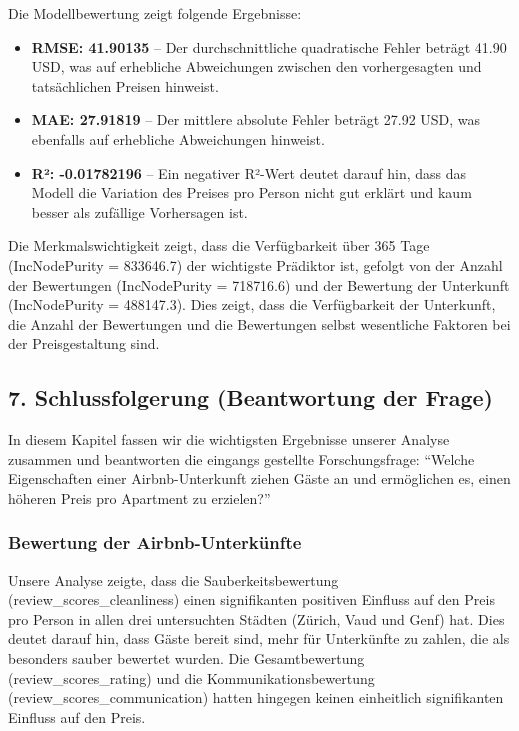 \documentclass[
  journal,
]{IEEEtran}%
\begin{document}
Die Modellbewertung zeigt folgende Ergebnisse:

\begin{itemize}
\item
  \textbf{RMSE: 41.90135} -- Der durchschnittliche quadratische Fehler
  beträgt 41.90 USD, was auf erhebliche Abweichungen zwischen den
  vorhergesagten und tatsächlichen Preisen hinweist.
\item
  \textbf{MAE: 27.91819} -- Der mittlere absolute Fehler beträgt 27.92
  USD, was ebenfalls auf erhebliche Abweichungen hinweist.
\item
  \textbf{R²: -0.01782196} -- Ein negativer R²-Wert deutet darauf hin,
  dass das Modell die Variation des Preises pro Person nicht gut erklärt
  und kaum besser als zufällige Vorhersagen ist.
\end{itemize}

Die Merkmalswichtigkeit zeigt, dass die Verfügbarkeit über 365 Tage
(IncNodePurity = 833646.7) der wichtigste Prädiktor ist, gefolgt von der
Anzahl der Bewertungen (IncNodePurity = 718716.6) und der Bewertung der
Unterkunft (IncNodePurity = 488147.3). Dies zeigt, dass die
Verfügbarkeit der Unterkunft, die Anzahl der Bewertungen und die
Bewertungen selbst wesentliche Faktoren bei der Preisgestaltung sind.

\hypertarget{schlussfolgerung-beantwortung-der-frage}{%
\subsection{7. Schlussfolgerung (Beantwortung der
Frage)}\label{schlussfolgerung-beantwortung-der-frage}}

In diesem Kapitel fassen wir die wichtigsten Ergebnisse unserer Analyse
zusammen und beantworten die eingangs gestellte Forschungsfrage:
``Welche Eigenschaften einer Airbnb-Unterkunft ziehen Gäste an und
ermöglichen es, einen höheren Preis pro Apartment zu erzielen?''

\hypertarget{bewertung-der-airbnb-unterkuxfcnfte-1}{%
\subsubsection{Bewertung der
Airbnb-Unterkünfte}\label{bewertung-der-airbnb-unterkuxfcnfte-1}}

Unsere Analyse zeigte, dass die Sauberkeitsbewertung
(review\_scores\_cleanliness) einen signifikanten positiven Einfluss auf
den Preis pro Person in allen drei untersuchten Städten (Zürich, Vaud
und Genf) hat. Dies deutet darauf hin, dass Gäste bereit sind, mehr für
Unterkünfte zu zahlen, die als besonders sauber bewertet wurden. Die
Gesamtbewertung (review\_scores\_rating) und die Kommunikationsbewertung
(review\_scores\_communication) hatten hingegen keinen einheitlich
signifikanten Einfluss auf den Preis.
\end{document}
